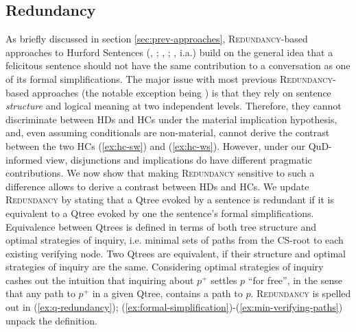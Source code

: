 \subsection{Redundancy}
As briefly discussed in section \ref{sec:prev-approaches}, \textsc{Redundancy}-based approaches to Hurford Sentences (\citeauthor{Meyer2013}, \citeyear{Meyer2013}; \citeauthor{Katzir2014}, \citeyear{Katzir2014}; \citeauthor{Mayr2016}, \citeyear{Mayr2016} i.a.) build on the general idea that a felicitous sentence should not have the same contribution to a conversation as one of its formal simplifications. The major issue with most previous \textsc{Redundancy}-based approaches (the notable exception being ) is that they rely on sentence \textit{structure} and logical meaning at two independent levels. Therefore, they cannot discriminate between HDs and HCs under the material implication hypothesis, and, even assuming conditionals are non-material, cannot derive the contrast between the two HCs (\ref{ex:hc-sw}) and (\ref{ex:hc-ws}). However, under our QuD-informed view, disjunctions and implications do have  different pragmatic contributions. We now show that making \textsc{Redundancy} sensitive to such a difference allows to derive a contrast between HDs and HCs. We update \textsc{Redundancy} by stating that a Qtree evoked by a sentence is redundant if it is equivalent to a Qtree evoked by one the sentence's formal simplifications. Equivalence between Qtrees is defined in terms of both tree structure and optimal strategies of inquiry, i.e. minimal sets of paths from the CS-root to each existing verifying node. Two Qtrees are equivalent, if their structure and optimal strategies of inquiry are the same. Considering optimal strategies of inquiry cashes out the intuition that inquiring about $p^+$ settles $p$ ``for free'', in the sense that any path to $p^+$ in a given Qtree, contains a path to $p$. \textsc{Redundancy} is spelled out in (\ref{ex:q-redundancy}); (\ref{ex:formal-simplification})-(\ref{ex:min-verifying-paths}) unpack the definition.

